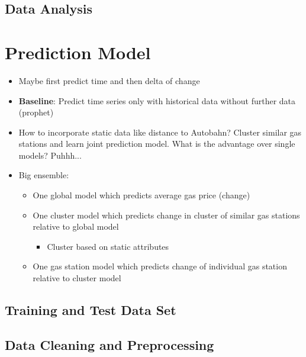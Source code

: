\documentclass[%
a4paper,
DIV12,
2.5headlines,
bigheadings,
titlepage,
openbib,
]{scrartcl}
\begin{document}
\subsection{Data Analysis}\label{data-analysis}



\section{Prediction Model}\label{prediction-model}
\begin{itemize}
\item Maybe first predict time and then delta of change\\
\item \textbf{Baseline}: Predict time series only with historical data without further data (prophet)\\
\item How to incorporate static data like distance to Autobahn? Cluster similar gas stations and learn joint prediction model. 
What is the advantage over single models? Puhhh...\\
\item Big ensemble:

\begin{itemize}
\item One global model which predicts average gas price (change)
\item One cluster model which predicts change in cluster of similar gas stations relative to global model

\begin{itemize}
\item Cluster based on static attributes
\end{itemize}

\item One gas station model which predicts change of individual gas station relative to cluster model
\end{itemize}
\end{itemize}



\subsection{Training and Test Data
Set}\label{training-and-test-data-set}


\subsection{Data Cleaning and
Preprocessing}\label{data-cleaning-and-preprocessing}
\end{document}
